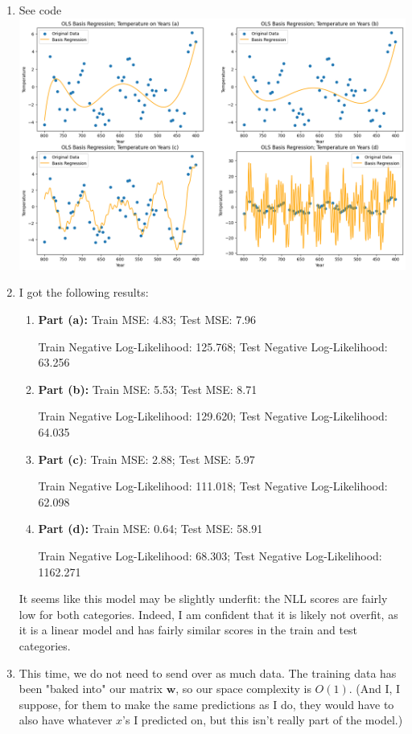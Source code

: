 \documentclass[submit]{harvardml}
\begin{document}
\begin{enumerate}
    \item See code
    \newline
    \includegraphics[scale=0.5]{hw1/1.3.1.png}
    \newline
    \item I got the following results:
    \begin{enumerate}
        \item \textbf{Part (a): }Train MSE: 4.83; Test MSE: 7.96
        
    Train Negative Log-Likelihood: 125.768; Test Negative Log-Likelihood: 63.256
        \item \textbf{Part (b):} Train MSE: 5.53; Test MSE: 8.71

 Train Negative Log-Likelihood: 129.620; Test Negative Log-Likelihood: 64.035

        \item \textbf{Part (c)}: Train MSE: 2.88; Test MSE: 5.97

 Train Negative Log-Likelihood: 111.018; Test Negative Log-Likelihood: 62.098
        \item \textbf{Part (d):} Train MSE: 0.64; Test MSE: 58.91

 Train Negative Log-Likelihood: 68.303; Test Negative Log-Likelihood: 1162.271
    \end{enumerate}
    It seems like this model may be slightly underfit: the NLL scores are fairly low for both categories. Indeed, I am confident that it is likely not overfit, as it is a linear model and has fairly similar scores in the train and test categories. 
    \item This time, we do not need to send over as much data. The training data has been "baked into" our matrix $\mathbf{w}$, so our space complexity is $O(1)$. (And I, I suppose, for them to make the same predictions as I do, they would have to also have whatever $x$'s I predicted on, but this isn't really part of the model.)
\end{enumerate}
\end{document}
